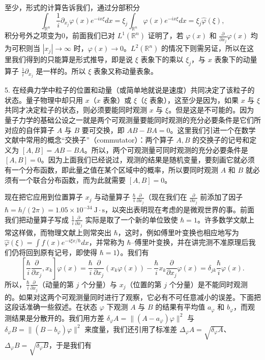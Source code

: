 至少，形式的计算告诉我们，通过分部积分
\[
 \int_{\mathbb R^n}\frac1i\partial_{x_j}\varphi(x)e^{-ix\xi}dx
 =\xi_j\int_{\mathbb R^n}\varphi(x)e^{-ix\xi}dx
 =\xi_j\widehat\varphi(\xi),
\]
积分号外之项变为0，前面我们已对 $L^1(\mathbb R^n)$ 证明了，若 $\varphi(x)$ 和 $\frac\partial{\partial x_j}\varphi(x)$ 均为可积则当 $|x_j|\to\infty$ 时，$\varphi(x)\to0$。$L^2(\mathbb R^n)$ 的情况下则需另证，所以在这里我们得到的只能算是形式推导，即是说 $\xi$ 表象下的乘以 $\xi_j$，与 $x$ 表象下的动量算子 $\frac1i\partial_{x_j}$ 是一样的。所以 $\xi$ 表象又称动量表象。

5. 在经典力学中粒子的位置和动量（或简单地就说是速度）共同决定了该粒子的状态。量子物理中却只用 $x$（$x$ 表象）或 $\xi$（$\xi$ 表象），这至少是因为，如果 $x$ 与 $\xi$ 共同才决定粒子的状态，则必须要能同时观测 $x$ 与 $\xi$。但是这是不可能的。因为量子力学的基础公设之一就是两个可观测量要能同时观测的充分必要条件是它们所对应的自伴算子 $A$ 与 $B$ 要可交换，即 $AB-BA=0$。这里我们引进一个在数学文献中常用的概念“交换子”（commutator）：两个算子 $A,B$ 的交换子的记号和定义为 $[A,B]=AB-BA$。所以，两个可观测量可同时观测的充分必要条件是 $[A,B]=0$。因为上面我们已经说过，观测的结果是随机变量，要刻画它就必须有一个分布函数，即此量之值在某个区域中的概率，所以要同时观测 $A$ 和 $B$ 就必须有一个联合分布函数，而为此就需要 $[A,B]=0$。

现在把它应用到位置算子 $x_j$ 与动量算子 $\frac\hbar i\frac\partial{\partial x_j}$（现在我们在 $\frac\partial{\partial x_j}$ 前添加了因子 $\hbar=h/(2\pi)=1.05\times10^{-34}\ \mathrm{J\cdot s}$，以突出表明现在考虑的是微观世界的事。前面我们把动量算子写成 $\frac1i\frac\partial{\partial x_j}$ 实际是取了一个新的单位致使 $\hbar=1$。许多数学文献上常这样做，而物理文献上则常突出 $\hbar$，这时，例如傅里叶变换也相应地写为 $\widehat\varphi(\xi)=\int f(x)e^{-i\xi x/\hbar}dx$，并常称为 $\hbar$--傅里叶变换，并在讲完测不准原理后我们仍将回到原有记号，即使得 $\hbar=1$）。我们有
\[
 \left[\frac\hbar i\frac\partial{\partial x_j},x_k\right]\varphi(x)
 =\frac\hbar i\frac\partial{\partial x_j}(x_k\varphi(x))
 -\frac\hbar i x_k\frac\partial{\partial x_j}\varphi(x)
 =\delta_{jk}\frac\hbar i\varphi(x).
\]
所以，$\frac\hbar i\frac\partial{\partial x_j}$（动量的第 $j$ 个分量）与 $x_j$（位置的第 $j$ 个分量）是不能同时观测的。如果对这两个可观测量同时进行了观察，它必有不可任意减小的误差。下面把这段话准确一些叙述。在状态 $\varphi$ 下观测 $A$ 与 $B$ 的结果有平均值 $a_\varphi$ 和 $b_\varphi$，而观测结果是分散开的。我们用方差 $\delta_\varphi A=\|(A-a_\varphi)\varphi\|^2$ 与 $\delta_\varphi B=\|(B-b_\varphi)\varphi\|^2$ 来度量，我们还引用了标准差 $\Delta_\varphi A=\sqrt{\delta_\varphi A}$、$\Delta_\varphi B=\sqrt{\delta_\varphi B}$，于是我们有

